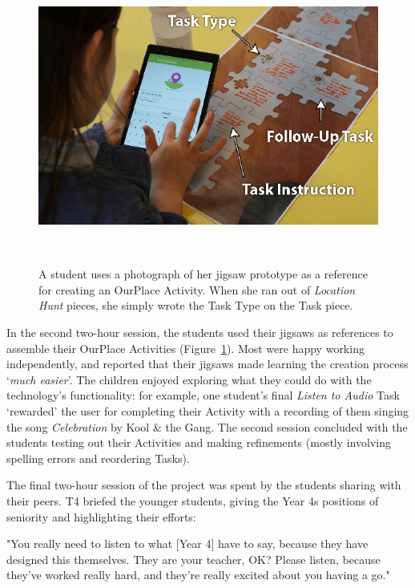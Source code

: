 \begin{figure}
\centering
  \includegraphics[width=0.7\columnwidth]{images/chapter08/jigsawToApp}
  \caption[A student referring to her paper prototype]{A student uses a photograph of her jigsaw prototype as a reference for creating an OurPlace Activity. When she ran out of \textit{Location Hunt} pieces, she simply wrote the Task Type on the Task piece.}~\label{fig:JigsawToApp}
\end{figure}

In the second two-hour session, the students used their jigsaws as references to assemble their OurPlace Activities (Figure~\ref{fig:JigsawToApp}). Most were happy working independently, and reported that their jigsaws made learning the creation process `\textit{much easier}'. The children enjoyed exploring what they could do with the technology's functionality: for example, one student's final \textit{Listen to Audio} Task `rewarded' the user for completing their Activity with a recording of them singing the song \textit{Celebration} by Kool \& the Gang. The second session concluded with the students testing out their Activities and making refinements (mostly involving spelling errors and reordering Tasks). 

The final two-hour session of the project was spent by the students sharing with their peers. T4 briefed the younger students, giving the Year 4s positions of seniority and highlighting their efforts:

\begin{displayquote}
"You really need to listen to what [Year 4] have to say, because they have designed this themselves. They are your teacher, OK? Please listen, because they've worked really hard, and they're really excited about you having a go."
\end{displayquote}

